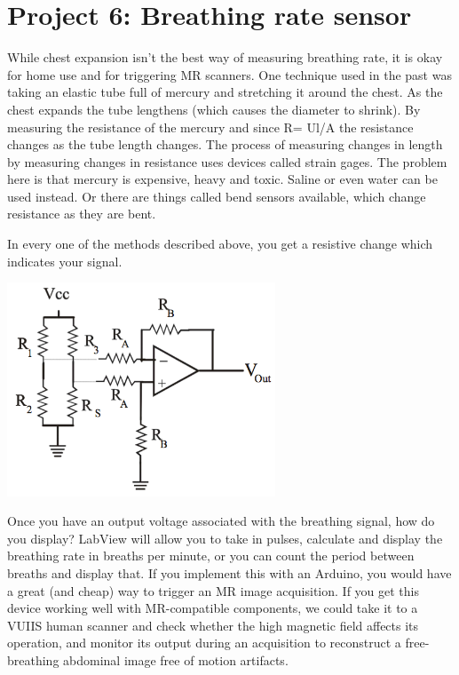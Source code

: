 \documentclass[12pt]{article}
\begin{document}
\section*{Project 6: Breathing rate sensor}

While chest expansion isn't the best way of measuring breathing rate, it is okay for home use and for triggering MR scanners. 
One technique used in the past was taking an elastic tube full of mercury and stretching it around the chest. 
As the chest expands the tube lengthens (which causes the diameter to shrink). 
By measuring the resistance of the mercury and since R= Ul/A the resistance changes as the tube length changes. 
The process of measuring changes in length by measuring changes in resistance uses devices called strain gages. 
The problem here is that mercury is expensive, heavy and toxic. 
Saline or even water can be used instead. 
Or there are things called bend sensors available, which change resistance as they are bent.

\par In every one of the methods described above, you get a resistive change which indicates your signal.

\begin{center}
\includegraphics[width=0.6\textwidth]{breathingsensorcircuit.png}
\end{center}

Once you have an output voltage associated with the breathing signal, how do you display? 
LabView will allow you to take in pulses, 
calculate and display the breathing rate in breaths per minute, or you can count the period between breaths and display that.
If you implement this with an Arduino, you would have a great (and cheap) way to trigger an MR image acquisition. 
If you get this device working well with MR-compatible components, we could take it to a VUIIS human scanner and check whether the high magnetic field affects its operation, and monitor its output during an acquisition to reconstruct a free-breathing abdominal image free of motion artifacts.
\end{document}
